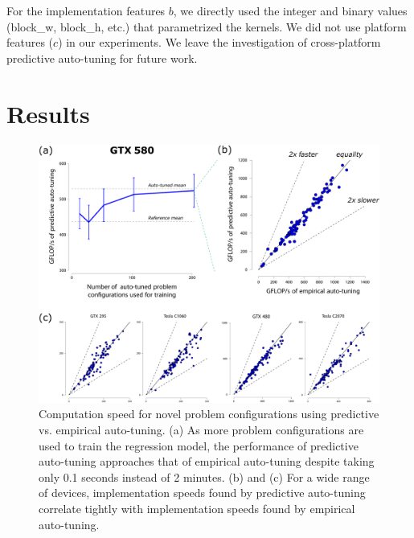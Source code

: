 \documentclass{sig-alternate}
\begin{document}
For the implementation features $b$, we directly used the integer and binary values (block\_w, block\_h, etc.) that parametrized the kernels.
We did not use platform features ($c$) in our experiments. We leave the investigation
of cross-platform predictive auto-tuning for future work.


\section{Results}

\begin{figure}[!ht]
\centering
\includegraphics[width=.9\linewidth]{illustrator/fig_main_R1.pdf}
\caption{
Computation speed for novel problem configurations using predictive
vs. empirical auto-tuning.
(a) As more problem configurations are used to train the regression model,
the performance of predictive auto-tuning approaches that of empirical auto-tuning
despite taking only 0.1 seconds instead of 2 minutes.
(b) and (c) For a wide range of devices, implementation speeds found by predictive auto-tuning correlate tightly with
implementation speeds found by empirical auto-tuning.
}
\label{fig:fig_gflop_scatter}
\end{figure}
\end{document}
